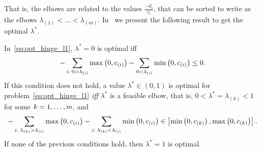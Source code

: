 That is, the elbows are related to the values $\frac{-d_i}{c_i}$, that can be sorted to write as the elbows ${\lambda}_{(1)} < \ldots < {\lambda}_{(m)}$.
In~\citet[Proposition 2]{RuizAD21} we present the following result to get the optimal $\lambda^*$.
\begin{proposition}\label{prop:hinge_neurocom2020}
    In~\eqref{eq:opt_hinge_l1}, $\lambda^*=0$ is optimal iff
    \begin{equation}
        \nonumber
        -\sum_{i:\; 0 > \lambda_{(i)}} \max\left(0, c_{(i)}\right) - \sum_{0 < \lambda_{(i)}} \min\left(0, c_{(i)}\right) \leq 0 .
        \end{equation}
        If this condition does not hold, a value $\lambda^* \in (0, 1)$ is optimal for problem~\eqref{eq:opt_hinge_l1} \emph{iff} $\lambda^*$ is a feasible elbow, that is, $0 < \lambda^* = \lambda_{(k)} < 1$ for some $k=1, \dotsc, m$, and
    \begin{equation}
        \label{eq:sol_hinge}
        -\sum_{i:\; \lambda_{(k)} > \lambda_{(i)}} \mymax{0, c_{(i)}} - \sum_{i:\; \lambda_{(k)} <\lambda_{(i)}} \mymin{0, c_{(i)}} \in \left[\mymin{0, c_{(k)}}, \mymax{0, c_{(k)}} \right] .
    \end{equation}
    If none of the previous conditions hold, then $\lambda^*=1$ is optimal.
\end{proposition}

